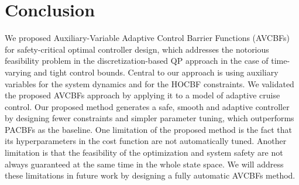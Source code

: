 \section{Conclusion}
\label{sec:Conclusion}
We proposed Auxiliary-Variable Adaptive Control Barrier Functions (AVCBFs) for safety-critical optimal controller design, which addresses the notorious feasibility problem in the discretization-based QP approach in the case of time-varying and tight control bounds. Central to our approach is using auxiliary variables for the system dynamics and for the HOCBF constraints. We validated the proposed AVCBFs approach by applying it to a model of adaptive cruise control. Our proposed method generates a safe, smooth and adaptive controller by designing fewer constraints and simpler parameter tuning, which outperforms PACBFs as the baseline. One limitation of the proposed method is the fact that its hyperparameters in the cost function are not automatically tuned. Another limitation is that the feasibility of the optimization and system safety are not always guaranteed at the same time in the whole state space. We will address these limitations in future work by designing a fully automatic AVCBFs method. 